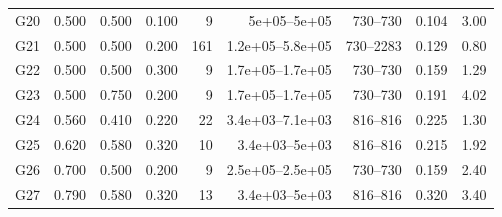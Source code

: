 {\begin{longtable}{rrrrrrrrr}
G20 & 0.500 & 0.500 & 0.100 & 9 & 5e+05--5e+05 & 730--730 & 0.104 & 3.00\\
G21 & 0.500 & 0.500 & 0.200 & 161 & 1.2e+05--5.8e+05 & 730--2283 & 0.129 & 0.80\\
G22 & 0.500 & 0.500 & 0.300 & 9 & 1.7e+05--1.7e+05 & 730--730 & 0.159 & 1.29\\
G23 & 0.500 & 0.750 & 0.200 & 9 & 1.7e+05--1.7e+05 & 730--730 & 0.191 & 4.02\\
G24 & 0.560 & 0.410 & 0.220 & 22 & 3.4e+03--7.1e+03 & 816--816 & 0.225 & 1.30\\
G25 & 0.620 & 0.580 & 0.320 & 10 & 3.4e+03--5e+03 & 816--816 & 0.215 & 1.92\\
G26 & 0.700 & 0.500 & 0.200 & 9 & 2.5e+05--2.5e+05 & 730--730 & 0.159 & 2.40\\
G27 & 0.790 & 0.580 & 0.320 & 13 & 3.4e+03--5e+03 & 816--816 & 0.320 & 3.40\\
\bottomrule\end{longtable}}